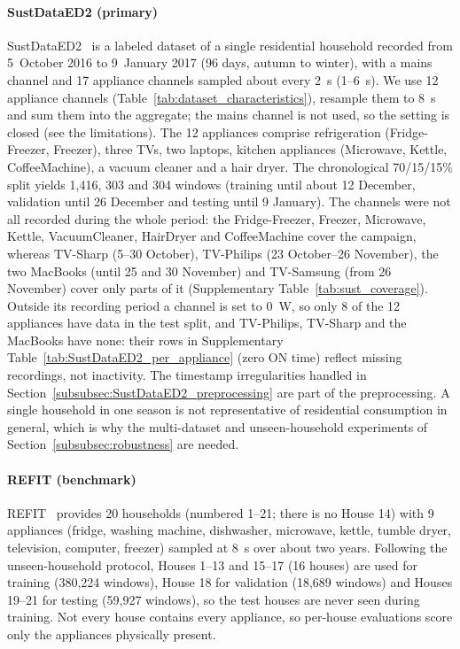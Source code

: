 \documentclass[fleqn,10pt]{wlscirep}
\begin{document}
\paragraph{SustDataED2 (primary)} SustDataED2~\cite{Pereira2023} is a labeled dataset of a single residential household recorded from 5~October 2016 to 9~January 2017 (96 days, autumn to winter), with a mains channel and 17 appliance channels sampled about every 2~s (1--6~s). We use 12 appliance channels (Table~\ref{tab:dataset_characteristics}), resample them to 8~s and sum them into the aggregate; the mains channel is not used, so the setting is closed (see the limitations). The 12 appliances comprise refrigeration (Fridge-Freezer, Freezer), three TVs, two laptops, kitchen appliances (Microwave, Kettle, CoffeeMachine), a vacuum cleaner and a hair dryer. The chronological 70/15/15\% split yields 1,416, 303 and 304 windows (training until about 12 December, validation until 26 December and testing until 9 January). The channels were not all recorded during the whole period: the Fridge-Freezer, Freezer, Microwave, Kettle, VacuumCleaner, HairDryer and CoffeeMachine cover the campaign, whereas TV-Sharp (5--30 October), TV-Philips (23 October--26 November), the two MacBooks (until 25 and 30 November) and TV-Samsung (from 26 November) cover only parts of it (Supplementary Table~\ref{tab:sust_coverage}). Outside its recording period a channel is set to 0~W, so only 8 of the 12 appliances have data in the test split, and TV-Philips, TV-Sharp and the MacBooks have none: their rows in Supplementary Table~\ref{tab:SustDataED2_per_appliance} (zero ON time) reflect missing recordings, not inactivity. The timestamp irregularities handled in Section~\ref{subsubsec:SustDataED2_preprocessing} are part of the preprocessing. A single household in one season is not representative of residential consumption in general, which is why the multi-dataset and unseen-household experiments of Section~\ref{subsubsec:robustness} are needed.

\paragraph{REFIT (benchmark)} REFIT~\cite{Murray2017refit} provides 20 households (numbered 1--21; there is no House 14) with 9 appliances (fridge, washing machine, dishwasher, microwave, kettle, tumble dryer, television, computer, freezer) sampled at 8~s over about two years. Following the unseen-household protocol, Houses 1--13 and 15--17 (16 houses) are used for training (380,224 windows), House 18 for validation (18,689 windows) and Houses 19--21 for testing (59,927 windows), so the test houses are never seen during training. Not every house contains every appliance, so per-house evaluations score only the appliances physically present.
\end{document}
